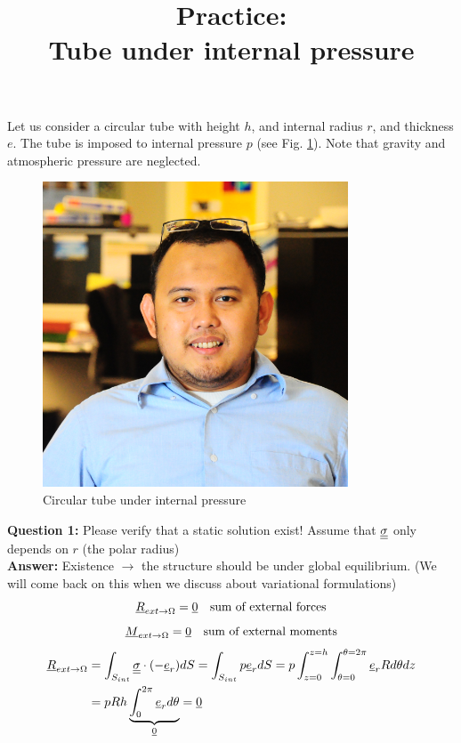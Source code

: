 \documentclass[letter,12pt]{article}
\begin{document}
\pagestyle{fancy}

\title{\textbf{Practice: \\ Tube under internal pressure}}
\date{}

\maketitle

\vspace{-1cm}


Let us consider a circular tube with height $h$, and internal radius $r$, and thickness $e$. The tube is imposed to internal pressure $p$ (see Fig. \ref{fig:replacewithrealfigure}). Note that gravity and atmospheric pressure are neglected.

\begin{figure}[ht]
	\centering
	\includegraphics[width=0.5\linewidth]{figures/replacewithrealfigure}
	\caption{Circular tube under internal pressure}
	\label{fig:replacewithrealfigure}
\end{figure}



\noindent \textbf{Question 1:} Please verify that a static solution exist! Assume that $\underline{\underline{\sigma}}$ only depends on $r$ (the polar radius)\\

\textbf{Answer:} Existence $\rightarrow$ the structure should be under global equilibrium. (We will come back on this when we discuss about variational formulations)
\begin{equation}
\underline{R}_{ext\rightarrow \Omega} = \underline{0}  \quad \text{sum of external forces}
\end{equation}
\begin{equation}
\underline{M}_{ext\rightarrow \Omega} = \underline{0}  \quad \text{sum of external moments}
\end{equation}
\begin{equation}
\begin{split}
\underline{R}_{ext\rightarrow \Omega} &= \int_{S_{int}} \underline{\underline{\sigma}} \cdot (-\underline{e}_r) dS = \int_{S_{int}} p \underline{e}_r dS = p \int_{z = 0}^{z = h} \int_{\theta = 0}^{\theta = 2\pi} \underline{e}_r R 
d\theta dz \\
&= pRh\underbrace{\int_{0}^{2\pi} \underline{e}_r d\theta}_{\underline{0}} = \underline{0}
\end{split}
\end{equation}
\end{document}
